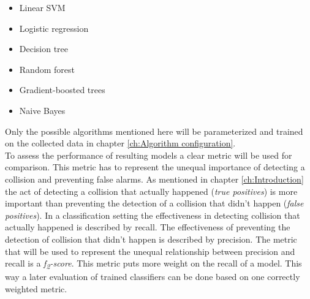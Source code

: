 \begin{itemize}
\item Linear SVM
\item Logistic regression
\item Decision tree
\item Random forest
\item Gradient-boosted trees
\item Naive Bayes
\end{itemize}

Only the possible algorithms mentioned here will be parameterized and trained on the  collected data in chapter \ref{ch:Algorithm configuration}.   \\

To assess the performance of resulting models a clear metric will be used for comparison. This metric has to represent the unequal importance of detecting a collision and preventing false alarms. As mentioned in chapter \ref{ch:Introduction} the act of detecting a collision that actually happened (\emph{true positives}) is more important than preventing the detection of a collision that didn't happen (\emph{false positives}). In a classification setting the effectiveness in detecting collision that actually happened is described by recall. The effectiveness of preventing the detection of collision that didn't happen is described by precision. The metric that will be used to represent the unequal relationship between precision and recall is a\emph{ f\textsubscript{2}-score}. This metric puts more weight on the recall of a model. This way a later evaluation of trained classifiers can be done based on one correctly weighted metric.